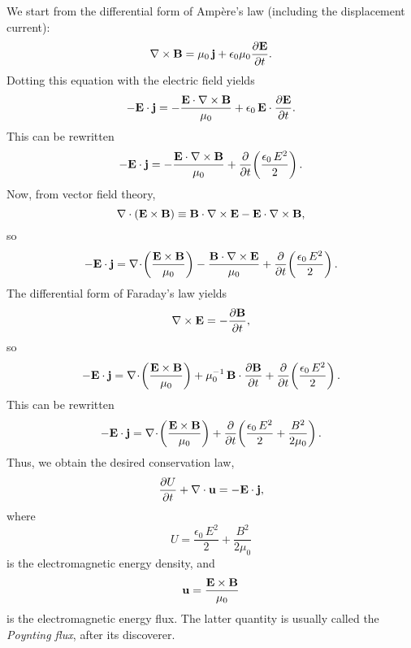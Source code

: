 We start from the differential form of Amp\`{e}re's law (including the displacement current):
\begin{equation}
\nabla\times{\bf B} = \mu_0\, {\bf j} +\epsilon_0\mu_0 \frac{\partial {\bf E}}
{\partial t}.
\end{equation}
Dotting this equation with the electric field yields
\begin{equation}
- {\bf E} \cdot {\bf j} = - \frac{ {\bf E}\cdot \nabla\times{\bf B}}{\mu_0}
+\epsilon_0 \,{\bf E}\cdot \frac{\partial {\bf E}}{\partial t}.
\end{equation}
This can be rewritten
\begin{equation}
- {\bf E} \cdot {\bf j} = - \frac{ {\bf E}\cdot \nabla\times{\bf B}}{\mu_0}
+\frac{\partial}{\partial t}\!\left(\frac{\epsilon_0 \,E^2}{2}\right).
\end{equation}
Now, from vector field theory,
\begin{equation}
\nabla\cdot({\bf E}\times{\bf B}) \equiv {\bf B}\cdot\nabla\times{\bf E} - {\bf E}
\cdot \nabla\times{\bf B},
\end{equation}
so
\begin{equation}
- {\bf E} \cdot {\bf j} = \nabla \!\cdot\!
\left(\frac{{\bf E}\times{\bf B}}{\mu_0}\right)
- \frac{{\bf B}\cdot\nabla\times {\bf E}}{\mu_0} + 
\frac{\partial}{\partial t}\!\left(\frac{\epsilon_0\, E^2}{2}\right).
\end{equation}
The differential form of Faraday's law yields
\begin{equation}
\nabla\times{\bf E} = - \frac{\partial {\bf B}}{\partial t},
\end{equation}
so
\begin{equation}
- {\bf E} \cdot {\bf j} = \nabla \!\cdot\!
\left(\frac{{\bf E}\times{\bf B}}{\mu_0}\right)
+\mu_0^{-1}\,  {\bf B}\cdot\frac{\partial {\bf B}}{\partial t}  + 
\frac{\partial}{\partial t}\!\left(\frac{\epsilon_0\,E^2}{2}\right).
\end{equation}
This can be rewritten
\begin{equation}
- {\bf E} \cdot {\bf j} = \nabla\! \cdot
\!\left(\frac{{\bf E}\times{\bf B}}{\mu_0}\right)
+ \frac{\partial}{\partial t}\!\left( \frac{\epsilon_0\,E^2}{2} +\frac{B^2}{2\mu_0}
\right).
\end{equation}
Thus, we obtain the desired conservation law,
\begin{equation}\label{econs}
\frac{\partial U}{\partial t} + \nabla\cdot{\bf u} = -{\bf E}\cdot {\bf j},
\end{equation}
where 
\begin{equation}\label{e8.18}
U  = \frac{\epsilon_0\,E^2}{2} + \frac{B^2}{2\mu_0}
\end{equation}
is the electromagnetic energy density,
and
\begin{equation}\label{e8.19}
{\bf u} = \frac{{\bf E}\times{\bf B}}{\mu_0}
\end{equation}
is the electromagnetic energy flux. The latter quantity is usually called the 
{\em Poynting flux}, after its discoverer.


